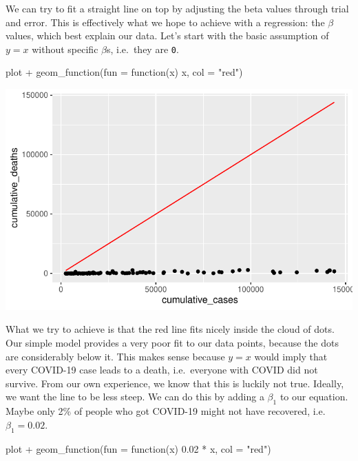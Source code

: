 \documentclass[
  letterpaper,
]{krantz}
\makeatletter
\newenvironment{Shaded}{\begin{snugshade}}{\end{snugshade}}
\newcommand{\AttributeTok}[1]{\textcolor[rgb]{0.40,0.45,0.13}{#1}}
\newcommand{\ControlFlowTok}[1]{\textcolor[rgb]{0.00,0.23,0.31}{#1}}
\newcommand{\FloatTok}[1]{\textcolor[rgb]{0.68,0.00,0.00}{#1}}
\newcommand{\FunctionTok}[1]{\textcolor[rgb]{0.28,0.35,0.67}{#1}}
\newcommand{\NormalTok}[1]{\textcolor[rgb]{0.00,0.23,0.31}{#1}}
\newcommand{\SpecialCharTok}[1]{\textcolor[rgb]{0.37,0.37,0.37}{#1}}
\newcommand{\StringTok}[1]{\textcolor[rgb]{0.13,0.47,0.30}{#1}}
\newenvironment{kframe}{%
\medskip{}
\setlength{\fboxsep}{.8em}
 \def\at@end@of@kframe{}%
 \ifinner\ifhmode%
  \def\at@end@of@kframe{\end{minipage}}%
  \begin{minipage}{\columnwidth}%
 \fi\fi%
 \def\FrameCommand##1{\hskip\@totalleftmargin \hskip-\fboxsep
 \colorbox{shadecolor}{##1}\hskip-\fboxsep
     \hskip-\linewidth \hskip-\@totalleftmargin \hskip\columnwidth}%
 \MakeFramed {\advance\hsize-\width
   \@totalleftmargin\z@ \linewidth\hsize
   \@setminipage}}%
 {\par\unskip\endMakeFramed%
 \at@end@of@kframe}
\renewenvironment{Shaded}{\begin{kframe}}{\end{kframe}}
\makeatother
\begin{document}
We can try to fit a straight line on top by adjusting the beta values
through trial and error. This is effectively what we hope to achieve
with a regression: the \(\beta\) values, which best explain our data.
Let's start with the basic assumption of \(y = x\) without specific
\(\beta\)s, i.e.~they are \texttt{0}.

\begin{Shaded}
\begin{Highlighting}[]
\NormalTok{plot }\SpecialCharTok{+}
  \FunctionTok{geom\_function}\NormalTok{(}\AttributeTok{fun =} \ControlFlowTok{function}\NormalTok{(x) x, }\AttributeTok{col =} \StringTok{"red"}\NormalTok{)}
\end{Highlighting}
\end{Shaded}

\includegraphics{13_regressions_files/figure-pdf/fitting-model-by-hand-step-four-1.pdf}

What we try to achieve is that the red line fits nicely inside the cloud
of dots. Our simple model provides a very poor fit to our data points,
because the dots are considerably below it. This makes sense because
\(y = x\) would imply that every COVID-19 case leads to a death,
i.e.~everyone with COVID did not survive. From our own experience, we
know that this is luckily not true. Ideally, we want the line to be less
steep. We can do this by adding a \(\beta_1\) to our equation. Maybe
only 2\% of people who got COVID-19 might not have recovered,
i.e.~\(\beta_1 = 0.02\).

\begin{Shaded}
\begin{Highlighting}[]
\NormalTok{plot }\SpecialCharTok{+}
  \FunctionTok{geom\_function}\NormalTok{(}\AttributeTok{fun =} \ControlFlowTok{function}\NormalTok{(x) }\FloatTok{0.02} \SpecialCharTok{*}\NormalTok{ x, }\AttributeTok{col =} \StringTok{"red"}\NormalTok{)}
\end{Highlighting}
\end{Shaded}
\end{document}
